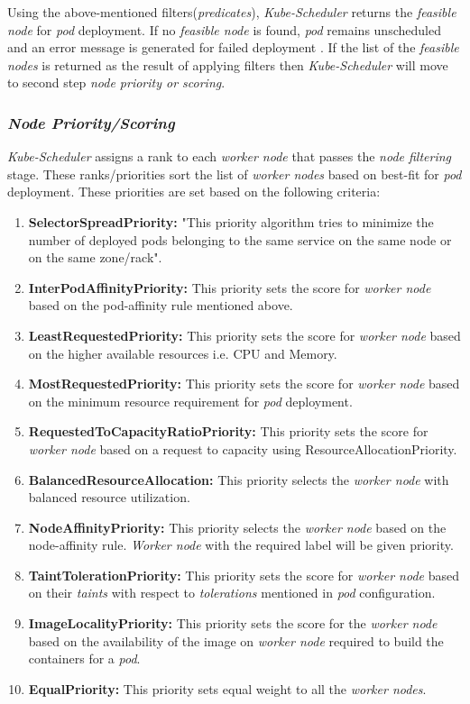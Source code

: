   Using the above-mentioned filters(\emph{predicates}), \emph{Kube-Scheduler} returns the \emph{feasible node} for \emph{pod} deployment. If no \emph{feasible node} is found, \emph{pod} remains unscheduled and an error message is generated for failed deployment \cite{Santos2019}. If the list of the \emph{feasible nodes} is returned as the result of applying filters then \emph{Kube-Scheduler} will move to second step \emph{node priority or scoring}.
  \subsubsection{\emph{Node Priority/Scoring}}
  \label{sec:node-priority}
  \emph{Kube-Scheduler} assigns a rank to each \emph{worker node} that passes the \emph{node filtering} stage. These ranks/priorities sort the list of \emph{worker nodes} based on best-fit for \emph{pod} deployment\cite{Santos2019}. These priorities are set based on the following criteria\cite{k8s}:
  \begin{enumerate}
    \item \textbf{SelectorSpreadPriority:} "This priority algorithm tries to minimize the number of deployed pods belonging to the same service on the same node or on the same zone/rack"\cite{Santos2019}.
    \item \textbf{InterPodAffinityPriority:} This priority sets the score for \emph{worker node} based on the pod-affinity rule mentioned above.
    \item \textbf{LeastRequestedPriority:} This priority sets the score for \emph{worker node} based on the higher available resources i.e. CPU and Memory.
    \item \textbf{MostRequestedPriority:} This priority sets the score for \emph{worker node} based on the minimum resource requirement for \emph{pod} deployment.
    \item \textbf{RequestedToCapacityRatioPriority:} This priority sets the score for \emph{worker node} based on a request to capacity using ResourceAllocationPriority.
    \item \textbf{BalancedResourceAllocation:} This priority selects the \emph{worker node} with balanced resource utilization.
    \item \textbf{NodeAffinityPriority:} This priority selects the \emph{worker node} based on the node-affinity rule. \emph{Worker node} with the required label will be given priority.
    \item \textbf{TaintTolerationPriority:} This priority sets the score for \emph{worker node} based on their \emph{taints} with respect to \emph{tolerations} mentioned in \emph{pod} configuration\cite{Santos2019}.
    \item \textbf{ImageLocalityPriority:} This priority sets the score for the \emph{worker node} based on the availability of the image on \emph{worker node} required to build the containers for a \emph{pod}.
    \item \textbf{EqualPriority:} This priority sets equal weight to all the \emph{worker nodes}.
  \end{enumerate}
